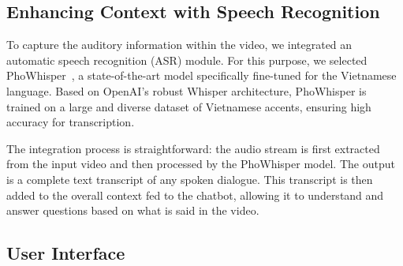 \subsection{Enhancing Context with Speech Recognition}

To capture the auditory information within the video, we integrated an automatic speech recognition (ASR) module. For this purpose, we selected PhoWhisper~\cite{le2024phowhisper}, a state-of-the-art model specifically fine-tuned for the Vietnamese language. Based on OpenAI's robust Whisper architecture, PhoWhisper is trained on a large and diverse dataset of Vietnamese accents, ensuring high accuracy for transcription.

The integration process is straightforward: the audio stream is first extracted from the input video and then processed by the PhoWhisper model. The output is a complete text transcript of any spoken dialogue. This transcript is then added to the overall context fed to the chatbot, allowing it to understand and answer questions based on what is said in the video.


\subsection{User Interface}

